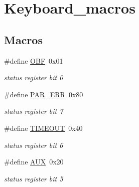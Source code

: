 \hypertarget{group__keyboard__macros}{}\section{Keyboard\+\_\+macros}
\label{group__keyboard__macros}
\subsection*{Macros}
\begin{DoxyCompactItemize}
\item 
\mbox{\label{group__keyboard__macros_ga45967c9e25447ba853cf6fb4ac545fe6}} 
\#define \hyperlink{group__keyboard__macros_ga45967c9e25447ba853cf6fb4ac545fe6}{O\+BF}~0x01
\begin{DoxyCompactList}\small\item\em status register bit 0 \end{DoxyCompactList}\item 
\mbox{\label{group__keyboard__macros_ga307ab71673e26ec42b28a3bca05d4cb5}} 
\#define \hyperlink{group__keyboard__macros_ga307ab71673e26ec42b28a3bca05d4cb5}{P\+A\+R\+\_\+\+E\+RR}~0x80
\begin{DoxyCompactList}\small\item\em status register bit 7 \end{DoxyCompactList}\item 
\mbox{\label{group__keyboard__macros_ga45ba202b05caf39795aeca91b0ae547e}} 
\#define \hyperlink{group__keyboard__macros_ga45ba202b05caf39795aeca91b0ae547e}{T\+I\+M\+E\+O\+UT}~0x40
\begin{DoxyCompactList}\small\item\em status register bit 6 \end{DoxyCompactList}\item 
\mbox{\label{group__keyboard__macros_ga1b41fd2be63532d4ab910f8b256c3811}} 
\#define \hyperlink{group__keyboard__macros_ga1b41fd2be63532d4ab910f8b256c3811}{A\+UX}~0x20
\begin{DoxyCompactList}\small\item\em status register bit 5 \end{DoxyCompactList}\item 
\mbox{\label{group__keyboard__macros_ga03f542f1e0e2ba512c4ed189decfee3d}} 

\end{DoxyCompactItemize}
